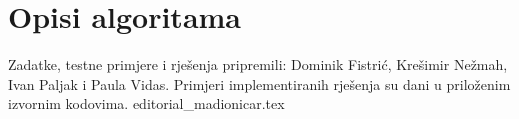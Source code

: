 \documentclass[a4paper]{article}
\date{May 29th 2022.}
\begin{document}
\section*{Opisi algoritama}
Zadatke, testne primjere i rješenja pripremili: Dominik Fistrić, Krešimir
Nežmah, Ivan Paljak i Paula Vidas.  Primjeri implementiranih rješenja su dani
u priloženim izvornim kodovima.
{editorial_madionicar.tex}
\end{document}
